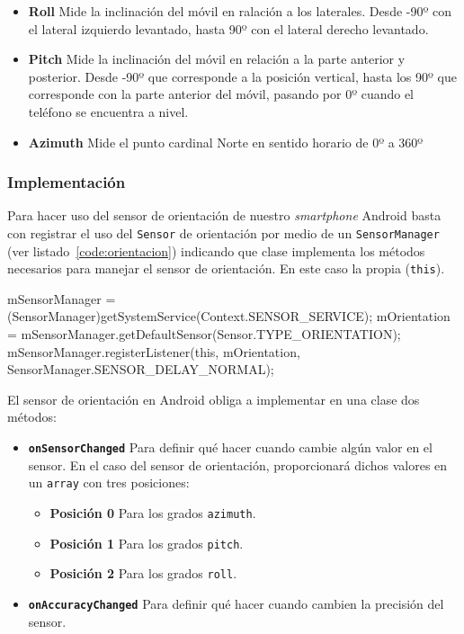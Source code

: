 \begin{itemize}
  \item \textbf{Roll} Mide la inclinación del móvil en ralación a los laterales. Desde -90º con el
    lateral izquierdo levantado, hasta 90º con el lateral derecho levantado.
  \item \textbf{Pitch} Mide la inclinación del móvil en relación a la parte anterior y
    posterior. Desde -90º que corresponde a la posición vertical, hasta los 90º que corresponde con
    la parte anterior del móvil, pasando por 0º cuando el teléfono se encuentra a nivel.
  \item \textbf{Azimuth} Mide el punto cardinal Norte en sentido horario de 0º a 360º
\end{itemize}

\subsubsection{Implementación}

Para hacer uso del sensor de orientación de nuestro \emph{smartphone} Android basta con registrar el
uso del \texttt{Sensor} de orientación por medio de un \texttt{SensorManager} (ver
listado~\ref{code:orientacion}) indicando que clase implementa los métodos necesarios para manejar
el sensor de orientación. En este caso la propia (\texttt{this}).

\begin{listing}[
  float=ht,
  language = java,
  caption  = {Ejemplo de registro de un \texttt{Sensor} de orientación con \texttt{SensorManager}},
  label    = code:orientacion]
mSensorManager = 
   (SensorManager)getSystemService(Context.SENSOR_SERVICE);
mOrientation =
   mSensorManager.getDefaultSensor(Sensor.TYPE_ORIENTATION);
mSensorManager.registerListener(this, mOrientation, SensorManager.SENSOR_DELAY_NORMAL);
\end{listing}

El sensor de orientación en Android obliga a implementar en una clase dos métodos:

\begin{itemize}
  \item \textbf{\texttt{onSensorChanged}} Para definir qué hacer cuando cambie algún valor en el
    sensor. En el caso del sensor de orientación, proporcionará dichos valores en un \texttt{array}
    con tres posiciones:
    \begin{itemize}
      \item \textbf{Posición 0} Para los grados \texttt{azimuth}.
      \item \textbf{Posición 1} Para los grados \texttt{pitch}.
      \item \textbf{Posición 2} Para los grados \texttt{roll}.
    \end{itemize}
  \item \textbf{\texttt{onAccuracyChanged}} Para definir qué hacer cuando cambien la precisión del
    sensor.
\end{itemize}

